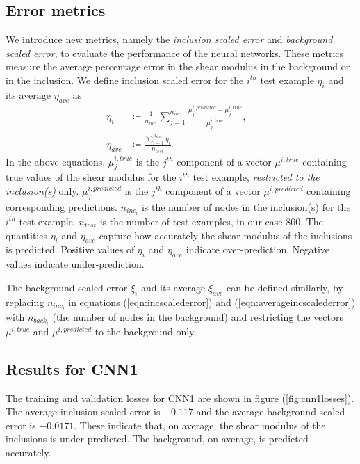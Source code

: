 \documentclass[10pt]{article}
\begin{document}
\subsection{Error metrics}
We introduce new metrics, namely the \textit{inclusion scaled error} and \textit{background scaled error}, to evaluate the performance of the neural networks. These metrics  measure the average percentage error in the shear modulus in the background or in the inclusion. We define inclusion scaled error for the $i^{th}$ test example $\eta_{i}$ and its average $\eta_{ave}$ as
\begin{subequations}
  \begin{align}
  \eta_{i} &\coloneqq \frac{1}{n_{inc_i}}\sum_{j=1}^{n_{inc_i}}\frac{\mu^{i,predicted}_{j}-\mu^{i,true}_{j}}{\mu^{i,true}_{j}},  &\label{eqn:incscalederror}\\
  \eta_{ave} &\coloneqq \frac{\sum_{i=1}^{n_{test}}\eta_{i}}{n_{test}}. &\label{eqn:averageincscalederror}
  \end{align}
\end{subequations}
In the above equations, $\mu_{j}^{i,true}$ is the $j^{th}$ component of a vector $\mu^{i,true}$ containing true values of the shear modulus for the $i^{th}$ test example, \textit{restricted to the inclusion(s)} only. $\mu_{j}^{i,predicted}$ is the $j^{th}$ component of a vector $\mu^{i,predicted}$ containing corresponding predictions. $n_{inc_i}$ is the number of nodes in the inclusion(s) for the $i^{th}$ test example. $n_{test}$ is the number of test examples, in our case $800$. The quantities $\eta_i$ and $\eta_{ave}$ capture how accurately the shear modulus of the inclusions is predicted. Positive values of $\eta_i$ and $\eta_{ave}$ indicate over-prediction. Negative values indicate under-prediction.

The background scaled error $\xi_{i}$ and its average $\xi_{ave}$ can be defined similarly, by replacing $n_{inc_i}$ in equations (\ref{eqn:incscalederror}) and (\ref{eqn:averageincscalederror})  with $n_{back_i}$ (the number of nodes in the background) and restricting the vectors $\mu^{i,true}$ and $\mu^{i,predicted}$ to the background only.
%
\subsection{\label{sect:resultscnn1}Results for CNN1}
%
The training and validation losses for CNN1 are shown in figure (\ref{fig:cnn1losses}). The average inclusion scaled error is $-0.117$ and the average background scaled error is $-0.0171$. These indicate that, on average, the shear modulus of the inclusions is under-predicted. The background, on average, is predicted accurately.
\end{document}
